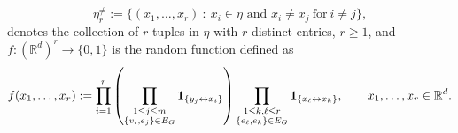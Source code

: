\documentclass[12pt]{article}
\newcommand{\R}{\mathbb{R}}
\newcommand{\bone}{{\bf 1}}
\def\real{{\mathord{\mathbb R}}}
\numberwithin{equation}{section}
\begin{document}
 $$
 \eta_r^{\ne}:=\{(x_1, \ldots ,x_r) \ : \ x_i\in\eta
 \mbox{ and } x_i\ne x_j~\mathrm{for}~i\ne j\},
 $$
 denotes the collection of $r$-tuples in $\eta$ with $r$ distinct entries,
 $r\geq 1$, and 
 $f:(\real^d)^r \to \{0,1\}$ is the random function defined as 
\begin{equation}
\nonumber
f(x_1, \ldots ,x_r):=\prod_{i=1}^r\left(\prod_{
  \substack{1 \leq j \leq m \\ \{v_i,e_j\}\in E_G }
}
\bone_{\{y_j\leftrightarrow x_i\}}\right)\prod_{\substack{1\leq k , \ell \leq r \\ \{e_\ell,e_k\}\in E_G}}\bone_{\{x_\ell\leftrightarrow x_k\}},
\qquad
 x_1,\ldots , x_r \in \R^d. 
\end{equation}
%
%
%
 
\end{document}
